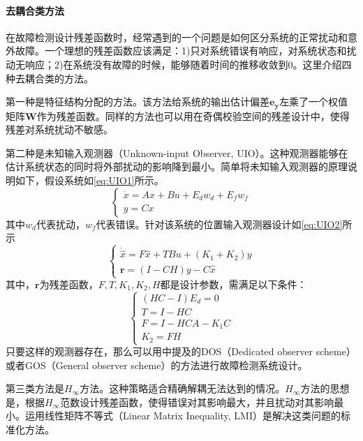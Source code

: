 \documentclass{article}
\begin{document}
\paragraph{去耦合类方法}在故障检测设计残差函数时，经常遇到的一个问题是如何区分系统的正常扰动和意外故障。一个理想的残差函数应该满足：1)只对系统错误有响应，对系统状态和扰动无响应；2)在系统没有故障的时候，能够随着时间的推移收敛到0\cite{1104419}。这里介绍四种去耦合类的方法。

第一种是特征结构分配的方法\cite{261546}。该方法给系统的输出估计偏差$\mathbf{e_y}$左乘了一个权值矩阵$\mathbf{W}$作为残差函数\cite{261546,RNC:RNC523}。同样的方法也可以用在奇偶校验空间的残差设计中，使得残差对系统扰动不敏感\cite{doi:10.1080/00207179508921908}。

第二种是未知输入观测器（Unknown-input Observer, UIO）。这种观测器能够在估计系统状态的同时将外部扰动的影响降到最小\cite{jie1996design,1657536,220921}。简单将未知输入观测器的原理说明如下，假设系统如\eqref{eq:UIO1}所示。
\begin{equation}\label{eq:UIO1}
\begin{cases}
\dot{x} = Ax+Bu+E_dw_d+E_fw_f \\
y = Cx 
\end{cases}
\end{equation}
其中$w_d$代表扰动，$w_f$代表错误。针对该系统的位置输入观测器设计如\eqref{eq:UIO2}所示
\begin{equation}\label{eq:UIO2}
\begin{cases}
\dot{\hat{x}}=F\hat{x}+TBu+(K_1+K_2)y \\
\mathbf{r} = (I-CH)y-C\hat{x}
\end{cases}
\end{equation}
其中，$\mathbf{r}$为残差函数，$F,T,K_1,K_2,H$都是设计参数，需满足以下条件：
\begin{equation*}
\begin{cases}
(HC-I)E_d=0\\
T = I - HC\\
F= I-HCA-K_1C\\
K_2=FH
\end{cases}
\end{equation*}
只要这样的观测器存在，那么可以用\cite{4101989}中提及的DOS（Dedicated observer scheme）或者GOS（General observer scheme）的方法进行故障检测系统设计。

第三类方法是$H_{\infty}$方法。这种策略适合精确解耦无法达到的情况\cite{doi:10.1080/002071799220704,Henry2005251}。$H_{\infty}$方法的思想是，根据$H_{\infty}$范数设计残差函数，使得错误对其影响最大，并且扰动对其影响最小。运用线性矩阵不等式（Linear Matrix Inequality, LMI）是解决这类问题的标准化方法\cite{Zhong2003543}。
\end{document}
